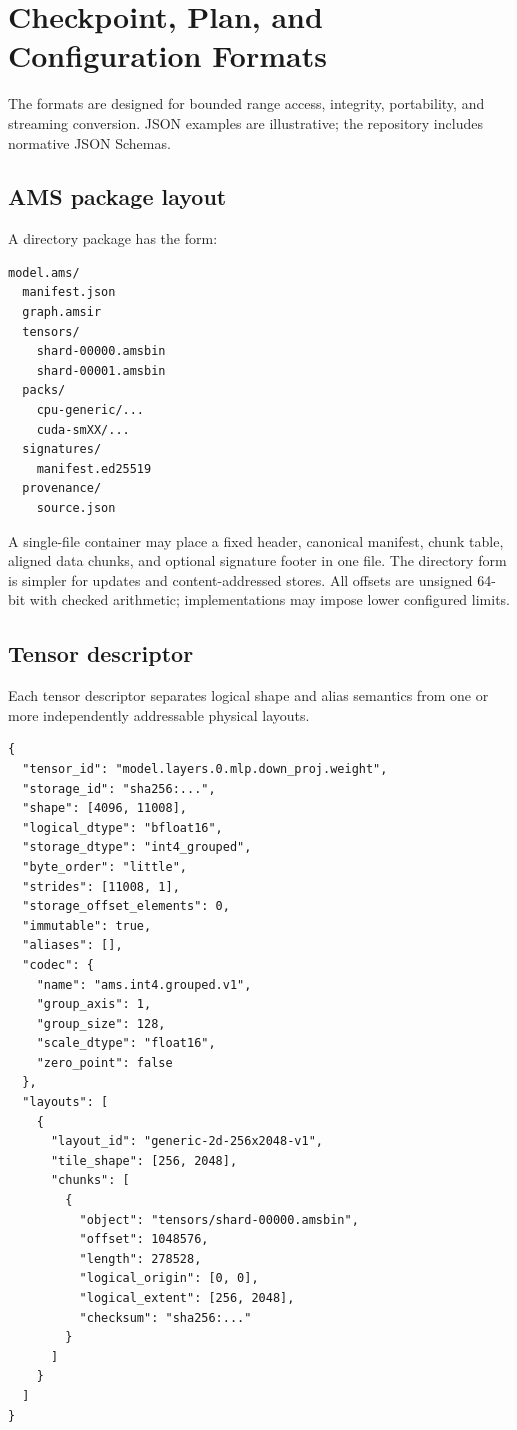 \section{Checkpoint, Plan, and Configuration Formats}
\label{app:formats}

The formats are designed for bounded range access, integrity, portability, and streaming conversion. JSON examples are illustrative; the repository includes normative JSON Schemas.

\subsection{AMS package layout}

A directory package has the form:

\begin{lstlisting}
model.ams/
  manifest.json
  graph.amsir
  tensors/
    shard-00000.amsbin
    shard-00001.amsbin
  packs/
    cpu-generic/...
    cuda-smXX/...
  signatures/
    manifest.ed25519
  provenance/
    source.json
\end{lstlisting}

A single-file container may place a fixed header, canonical manifest, chunk table, aligned data chunks, and optional signature footer in one file. The directory form is simpler for updates and content-addressed stores. All offsets are unsigned 64-bit with checked arithmetic; implementations may impose lower configured limits.

\subsection{Tensor descriptor}

Each tensor descriptor separates logical shape and alias semantics from one or more independently addressable physical layouts.

\begin{lstlisting}[language={},caption={Illustrative tensor manifest entry.}]
{
  "tensor_id": "model.layers.0.mlp.down_proj.weight",
  "storage_id": "sha256:...",
  "shape": [4096, 11008],
  "logical_dtype": "bfloat16",
  "storage_dtype": "int4_grouped",
  "byte_order": "little",
  "strides": [11008, 1],
  "storage_offset_elements": 0,
  "immutable": true,
  "aliases": [],
  "codec": {
    "name": "ams.int4.grouped.v1",
    "group_axis": 1,
    "group_size": 128,
    "scale_dtype": "float16",
    "zero_point": false
  },
  "layouts": [
    {
      "layout_id": "generic-2d-256x2048-v1",
      "tile_shape": [256, 2048],
      "chunks": [
        {
          "object": "tensors/shard-00000.amsbin",
          "offset": 1048576,
          "length": 278528,
          "logical_origin": [0, 0],
          "logical_extent": [256, 2048],
          "checksum": "sha256:..."
        }
      ]
    }
  ]
}
\end{lstlisting}

